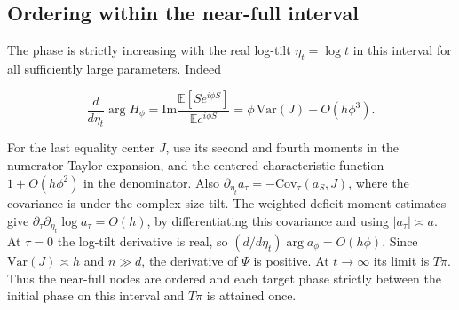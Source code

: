 \subsection{Ordering within the near-full interval}

The phase is strictly increasing with the real log-tilt $\eta_t=\log t$ in this interval for all sufficiently large parameters. Indeed

\begin{equation*}
\frac{d}{d\eta_t}\arg H_\phi
=\mathrm{Im}\frac{\mathbb E[S e^{i\phi S}]}{\mathbb E e^{i\phi S}}
=\phi\,\mathrm{Var}(J)+O(h\phi^3).
\end{equation*}

For the last equality center $J$, use its second and fourth moments in the numerator Taylor expansion, and the centered characteristic function $1+O(h\phi^2)$ in the denominator. Also $\partial_{\eta_t}a_\tau=-\mathrm{Cov}_\tau(a_S,J)$, where the covariance is under the complex size tilt. The weighted deficit moment estimates give $\partial_\tau\partial_{\eta_t}\log a_\tau=O(h)$, by differentiating this covariance and using $|a_\tau|\asymp a$. At $\tau=0$ the log-tilt derivative is real, so $(d/d\eta_t)\arg a_\phi=O(h\phi)$. Since $\mathrm{Var}(J)\asymp h$ and $n\gg d$, the derivative of $\Psi$ is positive. At $t\to\infty$ its limit is $T\pi$. Thus the near-full nodes are ordered and each target phase strictly between the initial phase on this interval and $T\pi$ is attained once.
